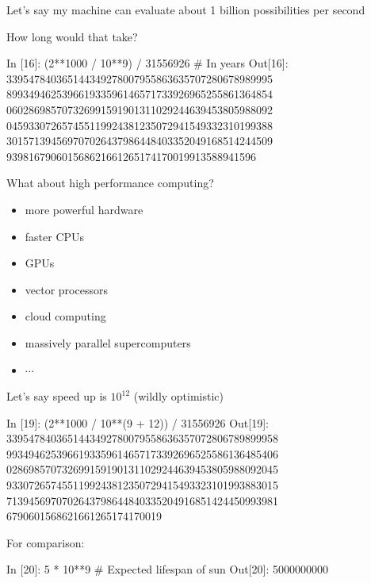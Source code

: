 \begin{frame}[fragile]

    Let's say my machine can evaluate about 1 billion possibilities per second

    How long would that take?

\end{frame}


\begin{frame}[fragile]


\begin{pythoncode}
In [16]: (2**1000 / 10**9) / 31556926  # In years
Out[16]:
339547840365144349278007955863635707280678989995
899349462539661933596146571733926965255861364854
060286985707326991591901311029244639453805988092
045933072657455119924381235072941549332310199388
301571394569707026437986448403352049168514244509
939816790601568621661265174170019913588941596
\end{pythoncode}

\end{frame}



\begin{frame}[fragile]

    What about high performance computing?
    
    \begin{itemize}
        \item more powerful hardware
        \item faster CPUs
        \item GPUs
        \item vector processors
        \item cloud computing
        \item massively parallel supercomputers
        \item $\cdots$
    \end{itemize}

    Let's say speed up is $10^{12}$ (wildly optimistic)



\end{frame}

\begin{frame}[fragile]


\begin{pythoncode}
In [19]: (2**1000 / 10**(9 + 12)) / 31556926
Out[19]:
3395478403651443492780079558636357072806789899958
9934946253966193359614657173392696525586136485406
0286985707326991591901311029244639453805988092045
9330726574551199243812350729415493323101993883015
7139456970702643798644840335204916851424450993981
6790601568621661265174170019
\end{pythoncode}

    For comparison:

\begin{pythoncode}
In [20]: 5 * 10**9 # Expected lifespan of sun
Out[20]: 5000000000
\end{pythoncode}


\end{frame}



